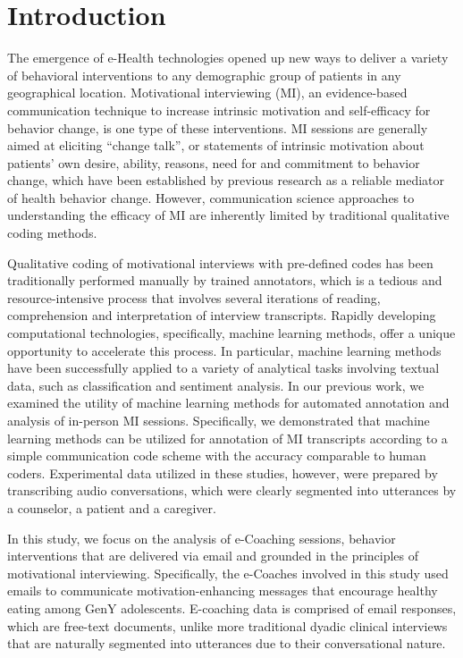 \documentclass{amia}
\begin{document}
\section*{Introduction}
The emergence of e-Health technologies opened up new ways to deliver a variety of behavioral interventions to any demographic group of patients in any geographical location. Motivational interviewing (MI), an evidence-based communication technique to increase intrinsic motivation and self-efficacy for behavior change,\cite{miller2012motivational,miller2009toward} is one type of these interventions. MI sessions are generally aimed at eliciting ``change talk'', or statements of intrinsic motivation about patients' own desire, ability, reasons, need for and commitment to behavior change, which have been established by previous research\cite{apodaca2009mechanisms} as a reliable mediator of health behavior change. However, communication science approaches to understanding the efficacy of MI are inherently limited by traditional qualitative coding methods. 

Qualitative coding of motivational interviews with pre-defined codes has been traditionally performed manually by trained annotators, which is a tedious and resource-intensive process that involves several iterations of reading, comprehension and interpretation of interview transcripts. Rapidly developing computational technologies, specifically, machine learning methods, offer a unique opportunity to accelerate this process. In particular, machine learning methods have been successfully applied to a variety of analytical tasks involving textual data, such as classification\cite{nigam2000text} and sentiment analysis.\cite{wang2012baselines} In our previous work, we examined the utility of machine learning methods for automated annotation \cite{hasan2016study,kotov2015interpretable} and analysis \cite{hasan2018predicting} of in-person MI sessions. Specifically, we demonstrated that machine learning methods can be utilized for annotation of MI transcripts according to a simple communication code scheme with the accuracy comparable to human coders.\cite{hasan2016study} Experimental data utilized in these studies, however, were prepared by transcribing audio conversations, which were clearly segmented into utterances by a counselor, a patient and a caregiver. 

In this study, we focus on the analysis of e-Coaching sessions, behavior interventions that are delivered via email and grounded in the principles of motivational interviewing. Specifically, the e-Coaches involved in this study used emails to communicate motivation-enhancing messages that encourage healthy eating among GenY adolescents. E-coaching data is comprised of email responses, which are free-text documents, unlike more traditional dyadic clinical interviews that are naturally segmented into utterances due to their conversational nature.
\end{document}
